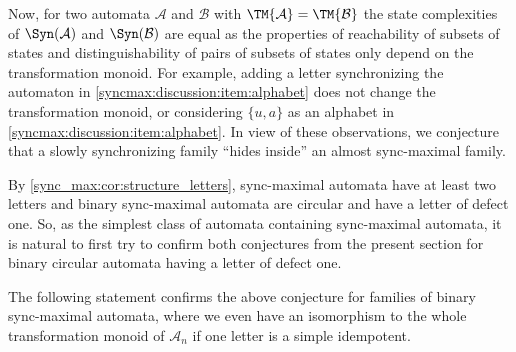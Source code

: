 Now, for two automata $\mathcal A$ and $\mathcal B$
with $\TM{\mathcal A} = \TM{\mathcal B}$
the state complexities of $\Syn(\mathcal A)$ and $\Syn(\mathcal B)$
are equal as the properties of reachability of subsets of states 
and distinguishability of pairs of subsets of states only
depend on the transformation monoid.
For example, adding a letter synchronizing the automaton in \cref{syncmax:discussion:item:alphabet} 
does not change the transformation monoid,
or considering $\{u,a\}$ as an alphabet in \cref{syncmax:discussion:item:alphabet}.
In view of these observations, 
we conjecture
that a slowly synchronizing family ``hides inside'' an almost sync-maximal family.

\begin{center}
\end{center}

By \cref{sync_max:cor:structure_letters}, sync-maximal automata have at least two letters and binary
sync-maximal automata are circular and have a letter of defect one. %
So, as the simplest class of automata containing sync-maximal automata, 
it is natural to first try to confirm both conjectures from the present section
for binary circular automata having a letter of defect one. 

The following statement confirms the above conjecture for families of binary sync-maximal automata,
where we even have an isomorphism to the whole transformation monoid of $\mathcal A_n$
if one letter is a simple idempotent.

